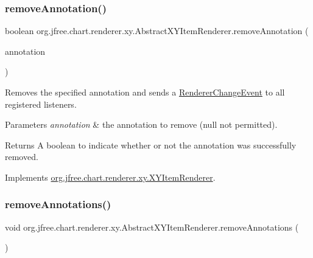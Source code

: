 \subsubsection{\texorpdfstring{remove\+Annotation()}{removeAnnotation()}}
{\footnotesize\ttfamily boolean org.\+jfree.\+chart.\+renderer.\+xy.\+Abstract\+X\+Y\+Item\+Renderer.\+remove\+Annotation (\begin{DoxyParamCaption}\item[{\mbox{\hyperlink{interfaceorg_1_1jfree_1_1chart_1_1annotations_1_1_x_y_annotation}{X\+Y\+Annotation}}}]{annotation }\end{DoxyParamCaption})}

Removes the specified annotation and sends a \mbox{\hyperlink{}{Renderer\+Change\+Event}} to all registered listeners.


\begin{DoxyParams}{Parameters}
{\em annotation} & the annotation to remove ({\ttfamily null} not permitted).\\
\hline
\end{DoxyParams}
\begin{DoxyReturn}{Returns}
A boolean to indicate whether or not the annotation was successfully removed. 
\end{DoxyReturn}


Implements \mbox{\hyperlink{interfaceorg_1_1jfree_1_1chart_1_1renderer_1_1xy_1_1_x_y_item_renderer_ac6ef484d5287771573064a5a76673d92}{org.\+jfree.\+chart.\+renderer.\+xy.\+X\+Y\+Item\+Renderer}}.

\mbox{\label{classorg_1_1jfree_1_1chart_1_1renderer_1_1xy_1_1_abstract_x_y_item_renderer_a2466581dbe1a0369953ed12de5efafc5}} 
\subsubsection{\texorpdfstring{remove\+Annotations()}{removeAnnotations()}}
{\footnotesize\ttfamily void org.\+jfree.\+chart.\+renderer.\+xy.\+Abstract\+X\+Y\+Item\+Renderer.\+remove\+Annotations (\begin{DoxyParamCaption}{ }\end{DoxyParamCaption})}

